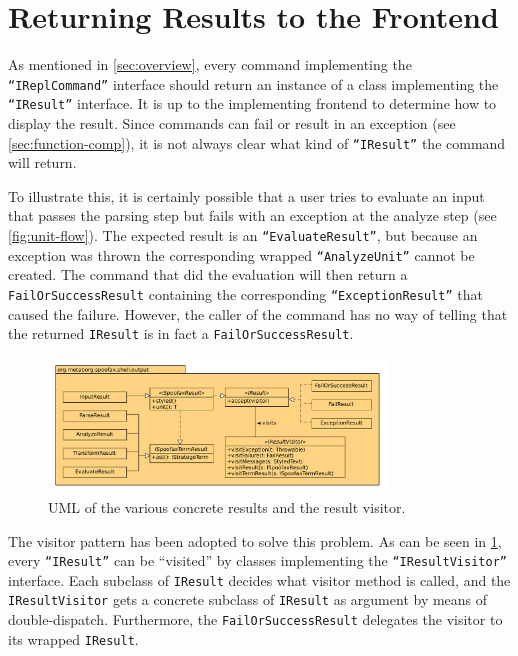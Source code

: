 \section{Returning Results to the Frontend}
\label{sec:visitor}

As mentioned in \cref{sec:overview}, every command implementing the
\texttt{``IReplCommand''} interface should return an instance of a class
implementing the \texttt{``IResult''} interface. It is up to the implementing
frontend to determine how to display the result. Since commands can fail or
result in an exception (see \cref{sec:function-comp}), it is not always clear
what kind of \texttt{``IResult''} the command will return.

To illustrate this, it is certainly possible that a user tries to evaluate an
input that passes the parsing step but fails with an exception at the analyze
step (see \cref{fig:unit-flow}).  The expected result is an
\texttt{``EvaluateResult''}, but because an exception was thrown the
corresponding wrapped \texttt{``AnalyzeUnit''} cannot be created. The command
that did the evaluation will then return a \texttt{FailOrSuccessResult}
containing the corresponding \texttt{``ExceptionResult''} that caused the
failure. However, the caller of the command has no way of telling that the
returned \texttt{IResult} is in fact a \texttt{FailOrSuccessResult}.

\begin{figure}[t]
  \centering
  \includegraphics[width=0.8\textwidth]{uml-visitor}
  \caption{UML of the various concrete results and the result visitor.}
  \label{fig:uml-visitor}
\end{figure}

The visitor pattern has been adopted to solve this problem. As can be seen in
\cref{fig:uml-visitor}, every \texttt{``IResult''} can be ``visited'' by classes
implementing the \texttt{``IResultVisitor''} interface. Each subclass of
\texttt{IResult} decides what visitor method is called, and the
\texttt{IResultVisitor} gets a concrete subclass of \texttt{IResult} as argument
by means of double-dispatch. Furthermore, the \texttt{FailOrSuccessResult}
delegates the visitor to its wrapped \texttt{IResult}.

